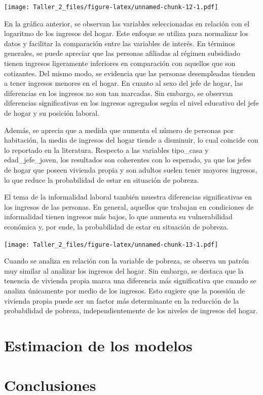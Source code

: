 \documentclass[
]{article}
\begin{document}
\texttt{[image: Taller\_2\_files/figure-latex/unnamed-chunk-12-1.pdf]}

En la gráfica anterior, se observan las variables seleccionadas en
relación con el logaritmo de los ingresos del hogar. Este enfoque se
utiliza para normalizar los datos y facilitar la comparación entre las
variables de interés. En términos generales, se puede apreciar que las
personas afiliadas al régimen subsidiado tienen ingresos ligeramente
inferiores en comparación con aquellos que son cotizantes. Del mismo
modo, se evidencia que las personas desempleadas tienden a tener
ingresos menores en el hogar. En cuanto al sexo del jefe de hogar, las
diferencias en los ingresos no son tan marcadas. Sin embargo, se
observan diferencias significativas en los ingresos agregados según el
nivel educativo del jefe de hogar y su posición laboral.

Además, se aprecia que a medida que aumenta el número de personas por
habitación, la media de ingresos del hogar tiende a disminuir, lo cual
coincide con lo reportado en la literatura. Respecto a las variables
tipo\_casa y edad\_jefe\_joven, los resultados son coherentes con lo
esperado, ya que los jefes de hogar que poseen vivienda propia y son
adultos suelen tener mayores ingresos, lo que reduce la probabilidad de
estar en situación de pobreza.

El tema de la informalidad laboral también muestra diferencias
significativas en los ingresos de las personas. En general, aquellos que
trabajan en condiciones de informalidad tienen ingresos más bajos, lo
que aumenta su vulnerabilidad económica y, por ende, la probabilidad de
estar en situación de pobreza.

\texttt{[image: Taller\_2\_files/figure-latex/unnamed-chunk-13-1.pdf]}

Cuando se analiza en relación con la variable de pobreza, se observa un
patrón muy similar al analizar los ingresos del hogar. Sin embargo, se
destaca que la tenencia de vivienda propia marca una diferencia más
significativa que cuando se analiza únicamente por medio de los
ingresos. Esto sugiere que la posesión de vivienda propia puede ser un
factor más determinante en la reducción de la probabilidad de pobreza,
independientemente de los niveles de ingresos del hogar.

\hypertarget{estimacion-de-los-modelos}{%
\section{Estimacion de los modelos}\label{estimacion-de-los-modelos}}

\hypertarget{conclusiones}{%
\section{Conclusiones}\label{conclusiones}}
\end{document}
